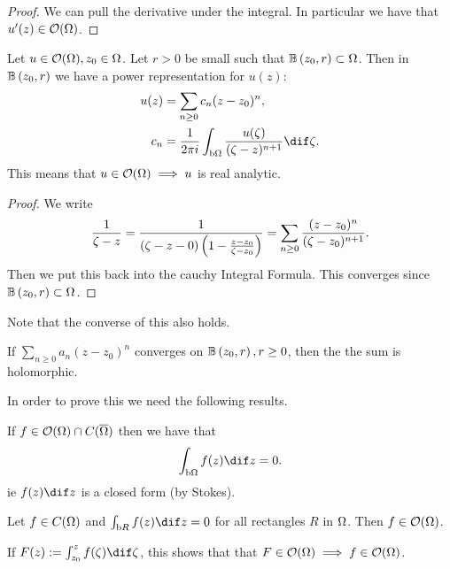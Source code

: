 \begin{proof}
    We can pull the derivative under the integral. In particular we have that $u'(z) \in \mathcal{O}(\Omega)$.
\end{proof}

\begin{corollary}
    Let $u \in \mathcal{O}(\Omega) , z_0 \in \Omega$. Let $r>0$ be small such that $\ball{z_0}{r} \subset \om$. Then in $\ball{z_0}{r}$ we have a power representation for $u(z)$:
    \begin{align*}
        u(z) &= \sum_{n \geq 0} c_n (z-z_0)^n,\\
        c_n &= \frac{1}{2 \pi i } \int_{\bdy \om} \frac{u(\zeta) }{(\zeta - z)^{n+1}} \dif \zeta.
    \end{align*}
    This means that $u \in \mathcal{O}(\Omega) \implies u$ is real analytic.
\end{corollary}

\begin{proof}
    We write
    \begin{align*}
        \frac{1}{\zeta - z} = \frac{1}{(\zeta - z-0) \left(  1 - \frac{z-z_0}{\zeta - z_0} \right)} = \sum_{n \geq 0} \frac{(z-z_0)^n}{(\zeta  - z_0)^{n+1}}.
    \end{align*}
    Then we put this back into the cauchy Integral Formula. This converges since $\ball{z_0}{r} \subset \om$.
\end{proof}

Note that the converse of this also holds.
\begin{corollary}
    If $\sum_{n \geq 0} a_n (z-z_0)^n$ converges on $\ball{z_0}{r}, r \geq 0$, then the the sum is holomorphic.
\end{corollary}

In order to prove this we need the following results.

\begin{theorem}
    If $f \in \mathcal{O}(\Omega) \cap C(\overline{\Omega})$ then we have that
    \begin{align*}
        \int_{\bdy \om} f(z) \dif z = 0.
    \end{align*}
    ie $f(z) \dif z$ is a closed form (by Stokes).
\end{theorem}

\begin{theorem}
    Let $f \in C(\Omega)$ and $\int_{\bdy R} f(z) \dif z = 0$ for all rectangles $R$ in $\Omega$. Then $f \in \mathcal{O}(\Omega)$. 
\end{theorem}

\begin{note}
    If $F(z) := \int_{z_0}^z f(\zeta) \dif \zeta$, this shows that that $F \in \mathcal{O} (\Omega) \implies f \in \mathcal{O}(\Omega)$.
\end{note}

